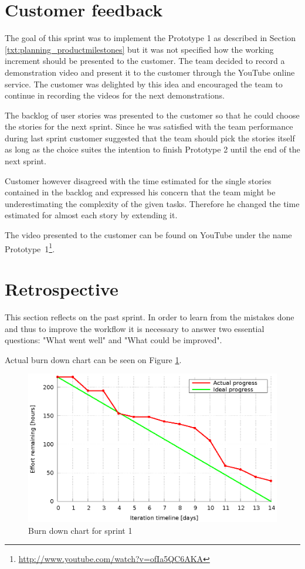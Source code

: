 \section{Customer feedback}
The goal of this sprint was to implement the Prototype 1 as described in Section \ref{txt:planning_productmilestones} but it was not specified how the working increment should be presented to the customer. The team decided to record a demonstration video and present it to the customer through the YouTube online service. The customer was delighted by this idea and encouraged the team to continue in recording the videos for the next demonstrations.

The backlog of user stories was presented to the customer so that he could choose the stories for the next sprint. Since he was satisfied with the team performance during last sprint customer suggested that the team should pick the stories itself as long as the choice suites the intention to finish Prototype 2 until the end of the next sprint.

Customer however disagreed with the time estimated for the single stories contained in the backlog and expressed his concern that the team might be underestimating the complexity of the given tasks. Therefore he changed the time estimated for almost each story by extending it.

The video presented to the customer can be found on YouTube under the name Prototype~1\footnote{\url{http://www.youtube.com/watch?v=ofIa5QC6AKA}}.

\section{Retrospective}
This section reflects on the past sprint. In order to learn from the mistakes done and thus to improve the workflow it is necessary to answer two essential questions: "What went well" and "What could be improved".

Actual burn down chart can be seen on Figure \ref{fig:Burn1}.  

\begin{figure}[h]
	\centering
		\includegraphics[width=14cm]{burndowns/sprint1.eps}
	\caption{Burn down chart for sprint 1}
	\label{fig:Burn1}
\end{figure}

